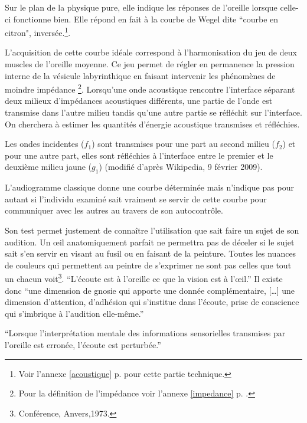 Sur le plan de la physique pure, elle indique les réponses de l'oreille
lorsque celle-ci fonctionne bien. Elle répond en fait à la courbe
de Wegel dite ``courbe en citron", inversée.\footnote{%
		Voir l'annexe \ref{acoustique} p. \pageref{acoustique}
		 pour cette partie technique.}.

L'acquisition de cette courbe idéale correspond à l'harmonisation
du jeu de deux muscles de l'oreille moyenne. Ce jeu
permet de régler en permanence la pression interne de la vésicule
labyrinthique en faisant intervenir les phénomènes de moindre impédance%
\footnote{Pour la définition de l'impédance voir l'annexe \ref{impedance} 
	p. \pageref{impedance}.}.
 Lorsqu'une onde acoustique rencontre l'interface
séparant deux milieux d'impédances acoustiques différents, une partie
de l'onde est transmise dans l'autre milieu tandis qu'une autre partie
se réfléchit sur l'interface. On cherchera à estimer les quantités
d'énergie acoustique transmises et réfléchies.

Les ondes incidentes ($f_1$) sont transmises pour une part au second
milieu ($f_2$) et pour une autre part, elles sont réfléchies à l'interface
entre le premier et le deuxième milieu jaune ($g_1$) (modifié d'après
Wikipedia, 9 février 2009).

L'audiogramme classique donne une courbe déterminée
mais n'indique pas pour autant si l'individu examiné
sait vraiment se servir de cette courbe pour communiquer avec les
autres au travers de son autocontrôle.

Son test permet justement de connaître l'utilisation que sait faire
un sujet de son audition. Un \oe il anatomiquement parfait ne permettra
pas de déceler si le sujet sait s'en servir en visant au fusil ou
en faisant de la peinture. Toutes les nuances de couleurs qui permettent
au peintre de s'exprimer ne sont pas celles que tout un chacun voit\footnote{Conférence, Anvers,1973.}. %
\enquote{L'écoute est à l'oreille ce que la vision est à
l'\oe il.} %
 Il existe donc \enquote{une dimension de gnosie qui apporte une
donnée complémentaire, [\dots] une dimension d'attention, d'adhésion
qui s'institue dans l'écoute, prise de conscience qui s'imbrique
à l'audition elle-même.}
 
\enquote{Lorsque l'interprétation mentale des informations sensorielles
trans\-mi\-ses par l'oreille est erronée, l'écoute est perturbée.}\autocite{tomatis.com}

